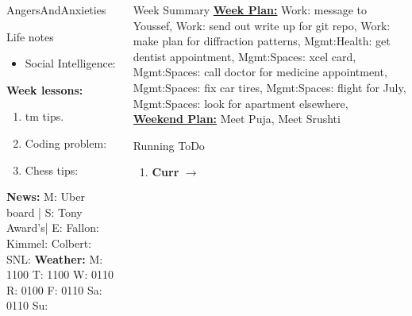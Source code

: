 \begin{columns}
\begin{column}{0.20\linewidth}
\begin{block}{AngersAndAnxieties}
\begin{itemize}
      \end{itemize}
    \end{block}
      \begin{block}{Life notes}
        \begin{itemize}
          \tiny \item \tiny Social Intelligence: 
        \end{itemize}
      \end{block}
      \begin{block}
        {\tiny {\bf Week lessons:}}
        \begin{enumerate}
        \item \tiny tm tips.
        \item \tiny Coding problem: 
        \item \tiny Chess tips: 
        \end{enumerate}
            {{\tiny {\tiny \bf  News:}} {\tiny  M: Uber board | S:
                Tony Award's| E: Fallon:  Kimmel:  Colbert: SNL:}}
            {{\tiny {\tiny \bf  Weather:}} {\tiny M: 1100 T: 1100 W:
                0110 R: 0100 F: 0110 Sa: 0110 Su: }}
      \end{block}
  \end{column}
  \begin{column}{0.6\linewidth}
    \begin{block}{Week Summary} 
      {\underline {\bf Week Plan:} 
        Work: message to Youssef,
        Work: send out write up for git repo, Work: make plan for diffraction patterns, 
        Mgmt:Health: get dentist appointment, Mgmt:Spaces: xcel card,
        Mgmt:Spaces: call doctor for medicine appointment,
        Mgmt:Spaces: fix car tires, Mgmt:Spaces: flight for July,
        Mgmt:Spaces: look for apartment elsewhere,} \\

      {\underline{\bf Weekend Plan:} Meet Puja, Meet Srushti }\\
    \end{block} 
      \begin{block}{Running ToDo} %
        \begin{enumerate} 
        \tiny \item \tiny \textbf{Curr} $\rightarrow$ 
      

\end{enumerate}
\end{block}
\end{column}
\end{columns}
